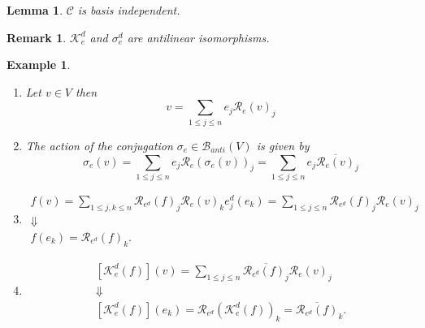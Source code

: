 \documentclass[aps,preprint]{revtex4}%
\newtheorem{example}[theorem]{Example}
\newtheorem{lemma}[theorem]{Lemma}
\newtheorem{remark}[theorem]{Remark}
\begin{document}
\begin{lemma}
$\mathcal{C}$ is basis independent.
\end{lemma}

\begin{remark}
$\mathcal{K}_{e}^{d}$ and $\mathcal{\sigma}_{e}^{d}$ are antilinear isomorphisms.
\end{remark}

\begin{example}
\begin{enumerate}
\item Let $v\in V$ then%
\begin{equation}
v=\sum_{1\leq j\leq n}e_{j}\mathcal{R}_{e}\left(  v\right)  _{j}%
\end{equation}


\item The action of the conjugation $\mathcal{\sigma}_{e}\in\mathcal{B}%
_{anti}\left(  V\right)  $ is given by
\begin{equation}
\mathcal{\sigma}_{e}\left(  v\right)  =\sum_{1\leq j\leq n}e_{j}%
\mathcal{R}_{e}\left(  \mathcal{\sigma}_{e}\left(  v\right)  \right)
_{j}=\sum_{1\leq j\leq n}e_{j}\overline{\mathcal{R}_{e}\left(  v\right)  }_{j}%
\end{equation}


\item
\begin{gather}
f\left(  v\right)  =\sum_{1\leq j,k\leq n}\mathcal{R}_{e^{d}}\left(  f\right)
_{j}\mathcal{R}_{e}\left(  v\right)  _{k}e_{j}^{d}\left(  e_{k}\right)
=\sum_{1\leq j\leq n}\mathcal{R}_{e^{d}}\left(  f\right)  _{j}\mathcal{R}%
_{e}\left(  v\right)  _{j}\\
\Downarrow\\
f\left(  e_{k}\right)  =\mathcal{R}_{e^{d}}\left(  f\right)  _{k}.
\end{gather}


\item
\begin{gather}
\left[  \mathcal{K}_{e}^{d}\left(  f\right)  \right]  \left(  v\right)
=\sum_{1\leq j\leq n}\overline{\mathcal{R}_{e^{d}}\left(  f\right)  _{j}%
}\mathcal{R}_{e}\left(  v\right)  _{j}\\
\Downarrow\\
\left[  \mathcal{K}_{e}^{d}\left(  f\right)  \right]  \left(  e_{k}\right)
=\mathcal{R}_{e^{d}}\left(  \mathcal{K}_{e}^{d}\left(  f\right)  \right)
_{k}=\overline{\mathcal{R}_{e^{d}}\left(  f\right)  }_{k}.
\end{gather}



\end{enumerate}
\end{example}
\end{document}
